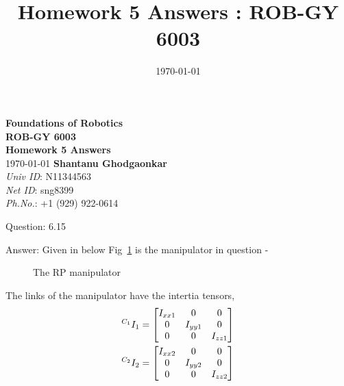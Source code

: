 \documentclass[a4paper]{article}
\title{Homework 5 Answers : ROB-GY 6003}
\author{\myName}
\date{\today}
\newcommand{\myName}{\textbf{Shantanu Ghodgaonkar}\\\textit{Univ ID}: N11344563\\\textit{Net ID}: sng8399\\\textit{Ph.No.}: +1 (929) 922-0614}
\begin{document}
	
	\begin{titlepage}
	    \centering
	    \vspace{2cm}
	    \Huge\textbf{Foundations of Robotics \\ ROB-GY 6003 \\ Homework 5 Answers}
	    \vspace{1cm}
	    \\ \Large \today
	    \vfill 
	    \Large \myName
	\end{titlepage}
	
	\begin{qalist}			
		\item[Question: 6.15] \setcounter{equation}{0} %
		\item[Answer:] Given in below Fig~\ref{fig:q6_15} is the manipulator in question -
			\begin{figure}[H]			
				\vspace{0.5cm}
				\centering
				\caption{The RP manipulator} 
				\label{fig:q6_15}
				\vspace{0.5cm}
			\end{figure}
			The links of the manipulator have the intertia tensors,
			\begin{align}
				{}^{{C}_{1}}{I}_{1} &= \begin{bmatrix} {I}_{xx1} & 0 & 0 \\ 0 & {I}_{yy1} & 0 \\ 0 & 0 & {I}_{zz1} \end{bmatrix} \notag \\
				{}^{{C}_{2}}{I}_{2} &= \begin{bmatrix} {I}_{xx2} & 0 & 0 \\ 0 & {I}_{yy2} & 0 \\ 0 & 0 & {I}_{zz2} \end{bmatrix}
			\end{align}
			

\end{qalist}
\end{document}

